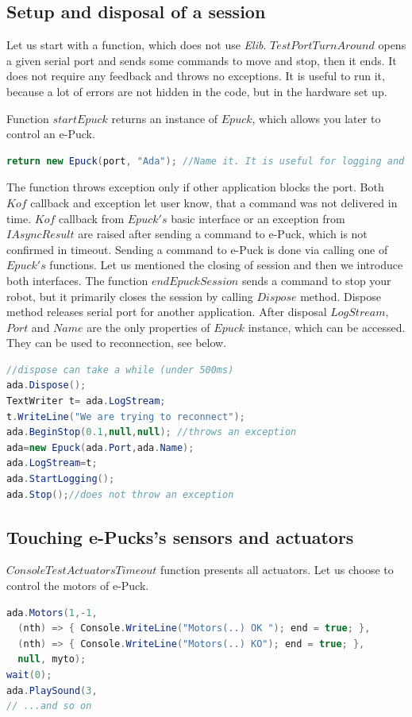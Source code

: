 \subsection{Setup and disposal of a session}\label{sec:session}
  Let us start with a function, which does not use {\it Elib}. $TestPortTurnAround$ opens a given serial port
  and sends some commands to move and stop, then it ends. It does not require any feedback and throws no exceptions.
  It is useful to run it, because a lot of errors are not hidden in the code, but in the hardware set up.

  Function $startEpuck$ returns an instance of $Epuck$, which allows you later to control an e-Puck.
\begin{lstlisting}[language=cs]
return new Epuck(port, "Ada"); //Name it. It is useful for logging and debugging.
\end{lstlisting}
  The function throws exception only if other application blocks the port. 
  Both $Kof$ callback and exception let user know, that a command was not delivered in time.
  $Kof$ callback from $Epuck's$ basic interface or an exception	
  from $IAsyncResult$ are raised after sending a command to e-Puck, 
  which is not confirmed in timeout.
  Sending a command to e-Puck is done via calling one of $Epuck's$ functions.
  Let us mentioned the closing of session and then we introduce both interfaces.
  The function $endEpuckSession$ sends a command to stop your robot, 
  but it primarily closes the session by calling $Dispose$ method.
  Dispose method releases serial port for another application. 
  After disposal $LogStream$, $Port$ and $Name$ are the 
  only properties of $Epuck$ instance, which can be accessed. 
  They can be used to reconnection, see below.

\begin{lstlisting}[language=cs]
//dispose can take a while (under 500ms)
ada.Dispose();
TextWriter t= ada.LogStream;
t.WriteLine("We are trying to reconnect");
ada.BeginStop(0.1,null,null); //throws an exception
ada=new Epuck(ada.Port,ada.Name);
ada.LogStream=t;
ada.StartLogging();
ada.Stop();//does not throw an exception
\end{lstlisting}

\subsection{Touching e-Pucks's sensors and actuators}\label{sec:touching}
  $ConsoleTestActuatorsTimeout$ function presents all actuators. Let us choose to control the motors of e-Puck.
\begin{lstlisting}[language=cs]
ada.Motors(1,-1,
  (nth) => { Console.WriteLine("Motors(..) OK "); end = true; },
  (nth) => { Console.WriteLine("Motors(..) KO"); end = true; },
  null, myto);
wait(0);
ada.PlaySound(3,
// ...and so on
\end{lstlisting}
  
